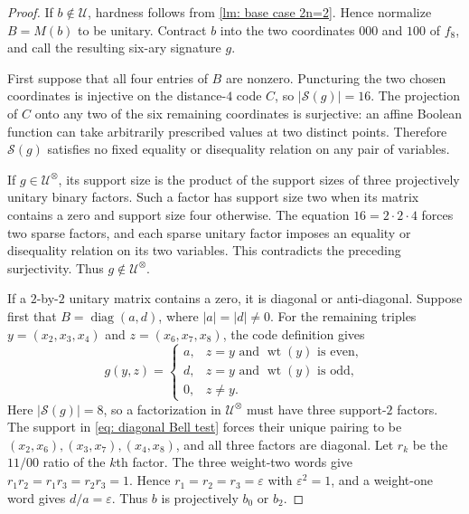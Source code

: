 \begin{proof}
If $b\notin\mathcal U$, hardness follows from
\cref{lm: base case 2n=2}.  Hence normalize $B=M(b)$ to be unitary.
Contract $b$ into the two coordinates $000$ and $100$ of $f_8$, and call
the resulting six-ary signature $g$.

First suppose that all four entries of $B$ are nonzero.  Puncturing the
two chosen coordinates is injective on the distance-$4$ code $C$, so
$|\mathscr S(g)|=16$.  The projection of $C$ onto any two of the six
remaining coordinates is surjective: an affine Boolean function can take
arbitrarily prescribed values at two distinct points.  Therefore
$\mathscr S(g)$ satisfies no fixed equality or disequality relation on
any pair of variables.

If $g\in\mathcal U^{\otimes}$, its support size is the product of the
support sizes of three projectively unitary binary factors.  Such a factor
has support size two when its matrix contains a zero and support size four
otherwise.  The equation $16=2\cdot2\cdot4$ forces two sparse factors,
and each sparse unitary factor imposes an equality or disequality relation
on its two variables.  This contradicts the preceding surjectivity.
Thus $g\notin\mathcal U^{\otimes}$.

If a $2$-by-$2$ unitary matrix contains a zero, it is diagonal or
anti-diagonal.  Suppose first that $B=\operatorname{diag}(a,d)$, where
$|a|=|d|\neq0$.  For the remaining triples
$y=(x_2,x_3,x_4)$ and $z=(x_6,x_7,x_8)$, the code definition gives
\begin{equation}
 g(y,z)=
 \begin{cases}
 a,&z=y\text{ and }\operatorname{wt}(y)\text{ is even},\\
 d,&z=y\text{ and }\operatorname{wt}(y)\text{ is odd},\\
 0,&z\neq y.
 \end{cases}
 \label{eq: diagonal Bell test}
\end{equation}
Here $|\mathscr S(g)|=8$, so a factorization in
$\mathcal U^{\otimes}$ must have three support-$2$ factors.  The support
in \eqref{eq: diagonal Bell test} forces their unique pairing to be
$(x_2,x_6),(x_3,x_7),(x_4,x_8)$, and all three factors are diagonal.
Let $r_k$ be the $11/00$ ratio of the $k$th factor.  The three weight-two
words give $r_1r_2=r_1r_3=r_2r_3=1$.  Hence
$r_1=r_2=r_3=\varepsilon$ with $\varepsilon^2=1$, and a weight-one word
gives $d/a=\varepsilon$.  Thus $b$ is projectively $b_0$ or $b_2$.


\end{proof}
